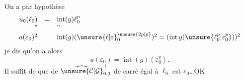 On a par hypothèse
\[
\begin{array}{rcl}
u_0(\ell_0)&=&\operatorname{int}(g)\ell_0^p\\
\text{''}&&\text{''}\\
u(\varepsilon_0)^2&&
\operatorname{int}(g)(\unsure{\ell|\varepsilon}_0^{\unsure{2p|p}})^2
=(\operatorname{int}g(\unsure{\ell_0^p|\varepsilon_0^p}))^2
\end{array}
\]
je dis qu'on a alors
\[
u(\varepsilon_0)=\operatorname{int}(g)(\varepsilon_0^p).
\]
Il suffit de  que
  de
$\widehat{\unsure{\mathcal C|\mathcal G}}_{0,3}^{+}$ de carré égal à $\ell_0$ est $\varepsilon_0$\ldots\quad OK

